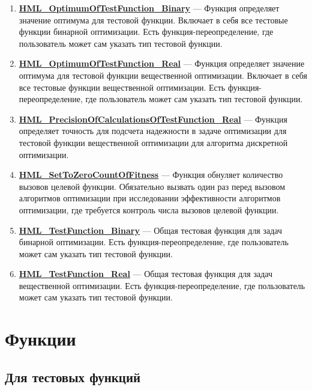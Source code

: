 \documentclass[a4paper,12pt]{article}
\begin{document}
\begin{enumerate}
\item \textbf{\hyperref[HML_OptimumOfTestFunction_Binary]{HML\_OptimumOfTestFunction\_Binary}} --- Функция определяет значение оптимума для тестовой функции. Включает в себя все тестовые функции бинарной оптимизации. Есть функция-переопределение, где пользователь может сам указать тип тестовой функции.

\item \textbf{\hyperref[HML_OptimumOfTestFunction_Real]{HML\_OptimumOfTestFunction\_Real}} --- Функция определяет значение оптимума для тестовой функции вещественной оптимизации. Включает в себя все тестовые функции вещественной оптимизации. Есть функция-переопределение, где пользователь может сам указать тип тестовой функции.

\item \textbf{\hyperref[HML_PrecisionOfCalculationsOfTestFunction_Real]{HML\_PrecisionOfCalculationsOfTestFunction\_Real}} --- Функция определяет точность для подсчета надежности в задаче оптимизации для тестовой функции вещественной оптимизации для алгоритма дискретной оптимизации.

\item \textbf{\hyperref[HML_SetToZeroCountOfFitness]{HML\_SetToZeroCountOfFitness}} --- Функция обнуляет количество вызовов целевой функции. Обязательно вызвать один раз перед вызовом алгоритмов оптимизации при исследовании эффективности    алгоритмов оптимизации, где требуется контроль числа вызовов целевой функции.

\item \textbf{\hyperref[HML_TestFunction_Binary]{HML\_TestFunction\_Binary}} --- Общая тестовая функция для задач бинарной оптимизации. Есть функция-переопределение, где пользователь может сам указать тип тестовой функции.

\item \textbf{\hyperref[HML_TestFunction_Real]{HML\_TestFunction\_Real}} --- Общая тестовая функция для задач вещественной оптимизации. Есть функция-переопределение, где пользователь может сам указать тип тестовой функции.

\end{enumerate}


\newpage
\section{Функции}
\subsection{Для тестовых функций}
\end{document}
